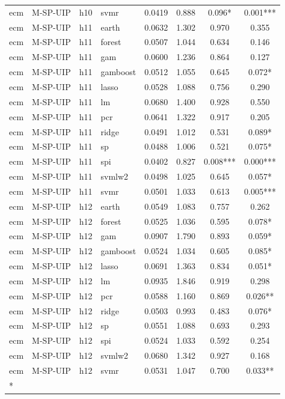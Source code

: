 \begin{ThreePartTable}
\begin{longtable}[t]{llclcccc}
ecm & M-SP-UIP & h10 & svmr & 0.0419 & 0.888 & 0.096* & 0.001***\\
\addlinespace
ecm & M-SP-UIP & h11 & earth & 0.0632 & 1.302 & 0.970 & 0.355\\
ecm & M-SP-UIP & h11 & forest & 0.0507 & 1.044 & 0.634 & 0.146\\
ecm & M-SP-UIP & h11 & gam & 0.0600 & 1.236 & 0.864 & 0.127\\
ecm & M-SP-UIP & h11 & gamboost & 0.0512 & 1.055 & 0.645 & 0.072*\\
ecm & M-SP-UIP & h11 & lasso & 0.0528 & 1.088 & 0.756 & 0.290\\
ecm & M-SP-UIP & h11 & lm & 0.0680 & 1.400 & 0.928 & 0.550\\
ecm & M-SP-UIP & h11 & pcr & 0.0641 & 1.322 & 0.917 & 0.205\\
ecm & M-SP-UIP & h11 & ridge & 0.0491 & 1.012 & 0.531 & 0.089*\\
ecm & M-SP-UIP & h11 & sp & 0.0488 & 1.006 & 0.521 & 0.075*\\
ecm & M-SP-UIP & h11 & spi & 0.0402 & 0.827 & 0.008*** & 0.000***\\
ecm & M-SP-UIP & h11 & svmlw2 & 0.0498 & 1.025 & 0.645 & 0.057*\\
ecm & M-SP-UIP & h11 & svmr & 0.0501 & 1.033 & 0.613 & 0.005***\\
\addlinespace
ecm & M-SP-UIP & h12 & earth & 0.0549 & 1.083 & 0.757 & 0.262\\
ecm & M-SP-UIP & h12 & forest & 0.0525 & 1.036 & 0.595 & 0.078*\\
ecm & M-SP-UIP & h12 & gam & 0.0907 & 1.790 & 0.893 & 0.059*\\
ecm & M-SP-UIP & h12 & gamboost & 0.0524 & 1.034 & 0.605 & 0.085*\\
ecm & M-SP-UIP & h12 & lasso & 0.0691 & 1.363 & 0.834 & 0.051*\\
ecm & M-SP-UIP & h12 & lm & 0.0935 & 1.846 & 0.919 & 0.298\\
ecm & M-SP-UIP & h12 & pcr & 0.0588 & 1.160 & 0.869 & 0.026**\\
ecm & M-SP-UIP & h12 & ridge & 0.0503 & 0.993 & 0.483 & 0.076*\\
ecm & M-SP-UIP & h12 & sp & 0.0551 & 1.088 & 0.693 & 0.293\\
ecm & M-SP-UIP & h12 & spi & 0.0524 & 1.033 & 0.592 & 0.254\\
ecm & M-SP-UIP & h12 & svmlw2 & 0.0680 & 1.342 & 0.927 & 0.168\\
ecm & M-SP-UIP & h12 & svmr & 0.0531 & 1.047 & 0.700 & 0.033**\\*
\end{longtable}
\end{ThreePartTable}
\endgroup{}
